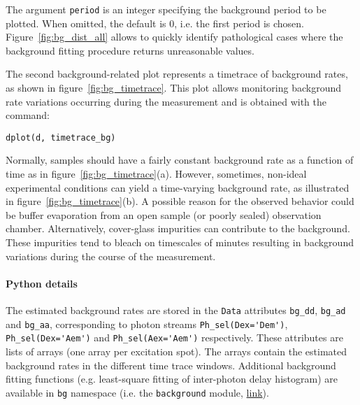 The argument \verb|period| is an integer specifying the background period to be plotted.
When omitted, the default is 0, i.e. the first period is chosen.
Figure~\ref{fig:bg_dist_all} allows to quickly identify pathological cases where the 
background fitting procedure returns unreasonable values. 

The second background-related plot represents a timetrace of background rates, 
as shown in figure~\ref{fig:bg_timetrace}. This plot allows monitoring background rate variations
occurring during the measurement and is obtained with the command:

\begin{lstlisting}
dplot(d, timetrace_bg)
\end{lstlisting}

Normally, samples should have a fairly constant background rate as a function of time
as in figure~\ref{fig:bg_timetrace}(a). However, sometimes, non-ideal
experimental conditions can yield a time-varying background rate, as illustrated in
figure~\ref{fig:bg_timetrace}(b).
A possible reason for the observed behavior could be buffer evaporation from an open sample 
(or poorly sealed) observation chamber. Alternatively,
cover-glass impurities can contribute to the background.
These impurities tend to bleach on timescales of minutes resulting in
background variations during the course of the measurement.

\paragraph{Python details} 

The estimated background rates are stored in the \verb|Data| attributes
\verb|bg_dd|, \verb|bg_ad| and \verb|bg_aa|, corresponding to photon
streams \verb|Ph_sel(Dex='Dem')|, \verb|Ph_sel(Dex='Aem')| and \verb|Ph_sel(Aex='Aem')|
respectively.
These attributes are lists of arrays (one array per excitation spot).
The arrays contain the estimated background rates in the different time trace windows.
Additional background fitting functions (e.g. least-square fitting of inter-photon delay
histogram) are available in \verb|bg| namespace 
(i.e. the \verb|background| module, \href{http://fretbursts.readthedocs.org/en/latest/background.html}
{link}). 
